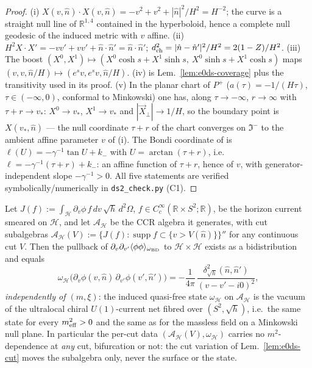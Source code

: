 \begin{proof}
(i) $X(v,\hat n)\cdot X(v,\hat n)=-v^2+v^2+|\hat n|^2/H^2=H^{-2}$;
the curve is a straight null line of $\mathbb R^{1,4}$ contained in
the hyperboloid, hence a complete null geodesic of the induced
metric with $v$ affine. (ii) $H^{2}X\cdot X'=-vv'+vv'+\hat
n\cdot\hat n'=\hat n\cdot\hat n'$; $d_{\rm ch}^2=|\hat n-\hat
n'|^2/H^2=2(1-Z)/H^2$. (iii) The boost
$(X^0,X^1)\mapsto(X^0\cosh s+X^1\sinh s,\ X^0\sinh s+X^1\cosh s)$
maps $(v,v,\hat n/H)\mapsto(e^{s}v,e^{s}v,\hat n/H)$. (iv) is
Lem.~\ref{lem:e0ds-coverage} plus the transitivity used in its
proof. (v) In the planar chart of $P^+$
($a(\tau)=-1/(H\tau)$, $\tau\in(-\infty,0)$, conformal to Minkowski)
one has, along $\tau\to-\infty$, $r\to\infty$ with
$\tau+r\to v_\ast$: $X^0\to v_\ast$, $X^1\to v_\ast$ and
$|\vec X_\perp|\to1/H$, so the boundary point is $X(v_\ast,\hat n)$
--- the null coordinate $\tau+r$ of the
chart converges on $\Im^-$ to the ambient affine parameter $v$ of
(i). The Bondi coordinate of
\cite{DappiaggiMorettiPinamonti2009} is
$\ell(U)=-\gamma^{-1}\tan U+k_-$ with $U=\arctan(\tau+r)$, i.e.\
$\ell=-\gamma^{-1}(\tau+r)+k_-$: an affine function of $\tau+r$,
hence of $v$, with generator-independent slope $-\gamma^{-1}>0$.
All five statements are verified symbolically/numerically in
\texttt{ds2\_check.py} (C1).
\end{proof}

\begin{lemma}
\label{lem:ds2-massinert}
Let $J(f):=\int_{\mathcal H}\partial_v\phi\,f\,dv\,\sqrt h\,
d^2\Omega$, $f\in C^\infty_c(\mathbb R\times S^2;\mathbb R)$, be the
horizon current smeared on $\mathcal H$, and let $\mathcal A_{\mathcal
H}$ be the CCR algebra it generates, with cut subalgebras $\mathcal
A_{\mathcal H}(V):=\{J(f):\operatorname{supp}f\subset\{v>V(\hat
n)\}\}''$ for any continuous cut $V$. Then the pullback of
$\partial_v\partial_{v'}\langle\phi\phi\rangle_{\omega_{\rm BD}}$ to
$\mathcal H\times\mathcal H$ exists as a bidistribution and equals
\begin{equation}
\label{eq:ds2-kernel}
\omega_{\mathcal H}\bigl(\partial_v\phi(v,\hat n)\,
\partial_{v'}\phi(v',\hat n')\bigr)
=-\frac{1}{4\pi}\,
\frac{\delta^2_{\sqrt h}(\hat n,\hat n')}{(v-v'-i0)^2},
\end{equation}
\emph{independently of $(m,\xi)$}: the induced quasi-free state
$\omega_{\mathcal H}$ on $\mathcal A_{\mathcal H}$ is the vacuum of
the ultralocal chiral $U(1)$-current net fibred over
$(S^2,\sqrt h)$, i.e.\ the same state for every $m^2_{\rm eff}>0$
and the same as for the massless field on a Minkowski null plane.
In particular the per-cut data $(\mathcal A_{\mathcal H}(V),
\omega_{\mathcal H})$ carries no $m^2$-dependence at \emph{any} cut,
bifurcation or not: the cut variation of Lem.~\ref{lem:e0ds-cut}
moves the subalgebra only, never the surface or the state.
\end{lemma}

